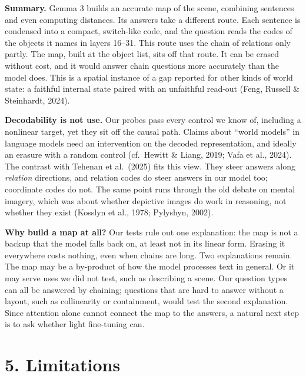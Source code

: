 \documentclass[
  11pt,
]{article}
\begin{document}
\textbf{Summary.} Gemma 3 builds an accurate map of the scene, combining
sentences and even computing distances. Its answers take a different
route. Each sentence is condensed into a compact, switch-like code, and
the question reads the codes of the objects it names in layers 16--31.
This route uses the chain of relations only partly. The map, built at
the object list, sits off that route. It can be erased without cost, and
it would answer chain questions more accurately than the model does.
This is a spatial instance of a gap reported for other kinds of world
state: a faithful internal state paired with an unfaithful read-out
(Feng, Russell \& Steinhardt, 2024).

\textbf{Decodability is not use.} Our probes pass every control we know
of, including a nonlinear target, yet they sit off the causal path.
Claims about ``world models'' in language models need an intervention on
the decoded representation, and ideally an erasure with a random control
(cf.~Hewitt \& Liang, 2019; Vafa et al., 2024). The contrast with
Tehenan et al.~(2025) fits this view. They steer answers along
\emph{relation} directions, and relation codes do steer answers in our
model too; coordinate codes do not. The same point runs through the old
debate on mental imagery, which was about whether depictive images do
work in reasoning, not whether they exist (Kosslyn et al., 1978;
Pylyshyn, 2002).

\textbf{Why build a map at all?} Our tests rule out one explanation: the
map is not a backup that the model falls back on, at least not in its
linear form. Erasing it everywhere costs nothing, even when chains are
long. Two explanations remain. The map may be a by-product of how the
model processes text in general. Or it may serve uses we did not test,
such as describing a scene. Our question types can all be answered by
chaining; questions that are hard to answer without a layout, such as
collinearity or containment, would test the second explanation. Since
attention alone cannot connect the map to the answers, a natural next
step is to ask whether light fine-tuning can.

\section{5. Limitations}\label{limitations}
\end{document}
